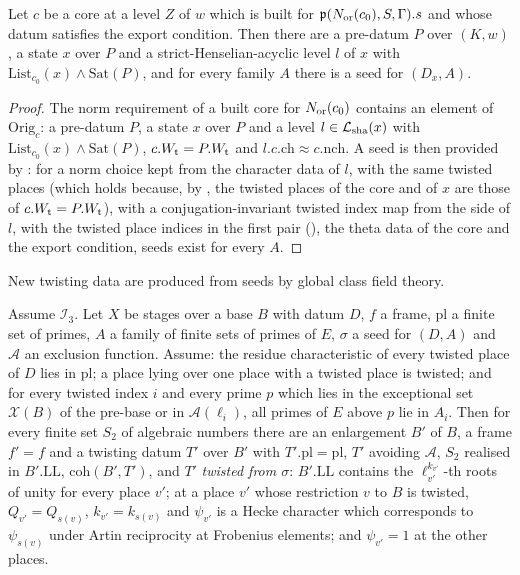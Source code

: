 \begin{lemma}\label{pf:baselat2:prepoint}
Let $c$ be a core at a level $Z$ of $w$ which is built for $\mathfrak{p}(N_{\mathrm{or}}(c_0),S,\Gamma).s$ and
whose datum satisfies the export condition. Then there are a pre-datum $P$ over $(K,w)$, a state $x$ over $P$
and a strict-Henselian-acyclic level $l$ of $x$ with $\mathrm{List}_{c_0}(x)\wedge\mathrm{Sat}(P)$, and for
every family $A$ there is a seed for $(D_x,A)$.
\end{lemma}

\begin{proof}
The norm requirement of a built core for $N_{\mathrm{or}}(c_0)$ contains an element of
$\mathrm{Orig}_c$: a pre-datum $P$, a state $x$ over $P$ and a level $l\in\mathcal{L}_{\mathrm{sha}}(x)$ with
$\mathrm{List}_{c_0}(x)\wedge\mathrm{Sat}(P)$, $c.W_{\mathrm{t}}=P.W_{\mathrm{t}}$ and $l.c.\mathrm{ch}\approx c.\mathrm{nch}$.
A seed is then provided by : for a norm
choice kept from the character data of $l$, with the same twisted places (which holds because, by
, the twisted places of the core and of $x$ are those
of $c.W_{\mathrm{t}}=P.W_{\mathrm{t}}$), with a conjugation-invariant twisted index map from the side of $l$, with the
twisted place indices in the first pair
(), the theta data of the
core and the export condition, seeds exist for every $A$.
\end{proof}

New twisting data are produced from seeds by global class field theory.

\begin{lemma}\label{pf:baselat2:twlift}
Assume $\mathcal{I}_3$. Let $X$ be stages over a base $B$ with datum $D$, $f$ a
frame, $\mathrm{pl}$ a finite set of primes, $A$ a family of finite sets of primes of $E$, $\sigma$ a seed for
$(D,A)$ and $\mathcal A$ an exclusion function. Assume: the residue characteristic of every twisted place of
$D$ lies in $\mathrm{pl}$; a place lying over one place with a twisted place is twisted; and for every
twisted index $i$
and every prime $p$ which lies in the exceptional set $\mathcal X(B)$ of the pre-base or in $\mathcal A(\ell_i)$, all
primes of $E$ above $p$ lie in $A_i$. Then for every finite set $S_2$ of algebraic numbers there are an
enlargement $B'$ of $B$, a frame $f'=f$ and a twisting datum $T'$ over $B'$ with $T'.\mathrm{pl}=\mathrm{pl}$,
$T'$ avoiding $\mathcal A$, $S_2$ realised in $B'.\mathrm{LL}$, $\mathrm{coh}(B',T')$, and $T'$ \emph{twisted from
$\sigma$}: $B'.\mathrm{LL}$ contains the $\ell_{v'}^{k_{v'}}$-th roots of unity for every place $v'$; at a
place $v'$ whose restriction $v$ to $B$ is twisted, $Q_{v'}=Q_{s(v)}$, $k_{v'}=k_{s(v)}$ and $\psi_{v'}$ is a
Hecke character which corresponds to $\psi_{s(v)}$ under Artin reciprocity at Frobenius elements;
and $\psi_{v'}=1$ at the other places.
\end{lemma}

